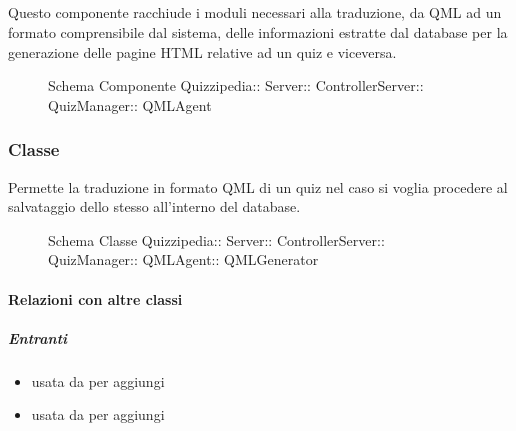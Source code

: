 \subsection{}
Questo componente racchiude i moduli necessari alla traduzione, da QML ad un formato comprensibile dal sistema, delle informazioni estratte dal database per la generazione delle pagine HTML relative ad un quiz e viceversa.
\begin{figure}[H]
\centering
\noindent{}
\caption[Schema Componente QMLAgent]{Schema Componente Quizzipedia:: Server:: ControllerServer:: QuizManager:: QMLAgent}
\end{figure}
\subsubsection{Classe }
Permette la traduzione in formato QML di un quiz nel caso si voglia procedere al salvataggio dello stesso all'interno del database.
\begin{figure}[H]
\centering
\noindent{}
\caption[Schema Classe QMLGenerator]{Schema Classe Quizzipedia:: Server:: ControllerServer:: QuizManager:: QMLAgent:: QMLGenerator}
\end{figure}
\paragraph{Relazioni con altre classi}
\subparagraph{Entranti}
\begin{itemize}
\item usata da  per aggiungi
\item usata da  per aggiungi
\end{itemize}
